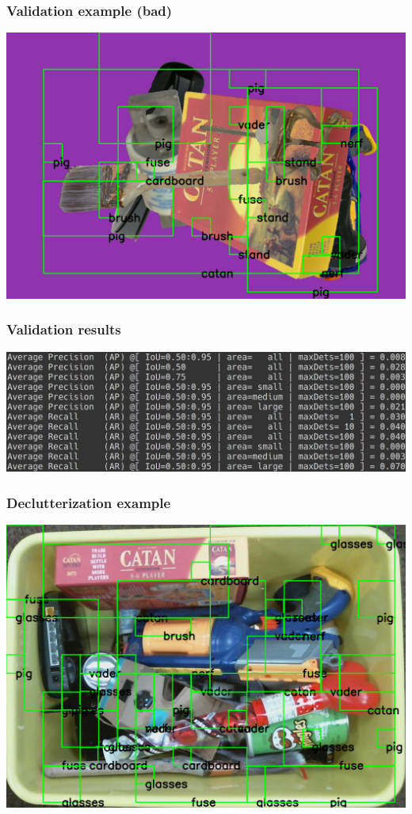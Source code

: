 \documentclass{beamer}
\begin{document}
\begin{frame}
  \frametitle{Validation example (bad)}
  \includegraphics[width=\textwidth]{valResults2.png}
\end{frame}

\begin{frame}
  \frametitle{Validation results}
  \includegraphics[width=\textwidth]{valScore.png}
\end{frame}

\begin{frame}
  \frametitle{Declutterization example}
  \includegraphics[width=\textwidth]{testResults.png}
\end{frame}
\end{document}

